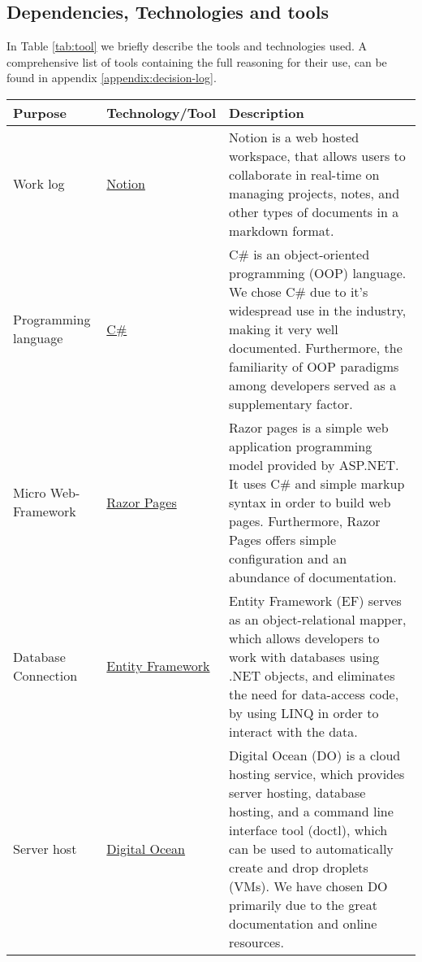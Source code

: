 
\subsection{Dependencies, Technologies and tools}


In Table \ref{tab:tool} we briefly describe the tools and technologies used. A comprehensive list of tools containing the full reasoning for their use, can be found in appendix \ref{appendix:decision-log}.

\begin{longtable}{|p{}|p{} | p{}|}
    \hline
    \textbf{Purpose} & \textbf{Technology/Tool} & \textbf{Description}\\
    \hline
    Work log & \href{https://www.notion.so/help/guides/category/documentation}{Notion} & Notion is a web hosted workspace, that allows users to collaborate in real-time on managing projects, notes, and other types of documents in a markdown format.\\
    \hline
    Programming language & \href{https://learn.microsoft.com/en-us/dotnet/csharp/}{C\#} &
    C\# is an object-oriented programming (OOP) language. We chose C\# due to it's widespread use in the industry, making it very well documented. Furthermore, the familiarity of OOP paradigms among developers served as a supplementary factor.\\
    \hline
    Micro Web-Framework & \href{https://learn.microsoft.com/en-us/aspnet/core/razor-pages/?view=aspnetcore-8.0&tabs=visual-studio}{Razor Pages} & Razor pages is a simple web application programming model provided by ASP.NET. It uses C\# and simple markup syntax in order to build web pages. Furthermore, Razor Pages offers simple configuration and an abundance of documentation.\\
    \hline
    Database Connection & \href{https://learn.microsoft.com/en-us/ef/core/}{Entity Framework} & Entity Framework (EF) serves as an object-relational mapper, which allows developers to work with databases using .NET objects, and eliminates the need for data-access code, by using LINQ in order to interact with the data.\\
    \hline
    Server host & \href{https://docs.digitalocean.com/}{Digital Ocean} & Digital Ocean (DO) is a cloud hosting service, which provides server hosting, database hosting, and a command line interface tool (doctl), which can be used to automatically create and drop droplets (VMs). We have chosen DO primarily due to the great documentation and online resources.\\

\end{longtable}
